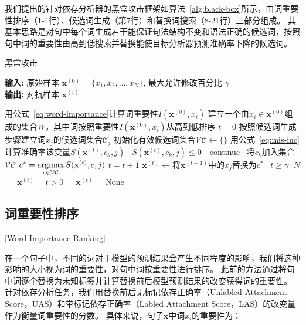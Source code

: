 我们提出的针对依存分析器的黑盒攻击框架如算法~\ref{alg:black-box}所示，由词重要性排序（1-4行）、候选词生成（第7行）和替换词搜索（8-21行）三部分组成。
其基本思路是对句中每个词生成若干能保证句法结构不变和语法正确的候选词，按照句中词的重要性由高到低搜索并替换能使目标分析器预测准确率下降的候选词。

\begin{algorithm}[!h]
	\begin{small}
		\small
		\caption{黑盒攻击}
		\label{alg:black-box}
		\begin{flushleft}
			\textbf{输入:} 原始样本 $\mathbf{x}^{(0)}=\{x_1,x_2,\dots,x_N\}$, 最大允许修改百分比 $\gamma$ \\
			\textbf{输出:} 对抗样本 $\mathbf{x}^{(i)}$
		\end{flushleft}
		\begin{algorithmic}[1]
			\STATE 用公式~\ref{eq:word-importance}计算词重要性$I(\mathbf{x}^{(0)},x_i)$
			\ENDFOR
			\STATE 建立一个由$x_i\in\mathbf{x}^{(0)}$组成的集合$W$，其中词按照重要性$I(\mathbf{x}^{(0)},x_i)$从高到低排序
			\STATE $t=0$
			\STATE 按照候选词生成步骤建立词$x_j$的候选词集合$\mathcal{C}_j$
			\STATE 初始化有效候选词集合$\mathcal{VC} \leftarrow \{\}$
			\STATE 用公式~\ref{eq:mis-inc}计算准确率该变量$S(\mathbf{x}^{(t)},c_k,j)$
			\STATE \algorithmicif\  $S(\mathbf{x}^{(t)},c_k,j) \le 0$\ \algorithmicthen\ continue\ \algorithmicendif
			\STATE 将$c_k$加入集合$\mathcal{VC}$
			\ENDFOR
			\STATE $c^* = \operatorname*{argmax}\limits_{c \in \mathcal{VC}} S(\mathbf{x}^{(t)},c,j)$
			\STATE $t = t + 1$
			\STATE $\mathbf{x}^{(t)} \leftarrow \text{将} \mathbf{x}^{(t-1)} \text{中的} x_j  \text{替换为} c^*$
			\STATE \algorithmicif\  $t \ge \gamma \cdot N $\ \algorithmicthen\   \algorithmicreturn\ $\mathbf{x}^{(t)}$\ \algorithmicendif
			\ENDIF
			\ENDFOR
			\STATE \algorithmicif\  $t > 0$\ \algorithmicthen\   \algorithmicreturn\ $\mathbf{x}^{(t)}$\ \algorithmicelse\ \algorithmicreturn\ None \algorithmicendif
		\end{algorithmic}
	\end{small}
\end{algorithm}


\subsection{词重要性排序}[Word Importance Ranking]

在一个句子中，不同的词对于模型的预测结果会产生不同程度的影响，我们将这种影响的大小视为词的重要性，对句中词按重要性进行排序。
此前的方法通过将句中词逐个替换为未知标签并计算替换前后模型预测结果的改变获得词的重要性。\cite{li2016visualizing,ren2019generating}
针对依存分析任务，我们用替换前后无标记依存正确率（Unlabled Attachment Score，UAS）和带标记依存正确率（Labled Attachment Score，LAS）的改变量作为衡量词重要性的分数。
具体来说，句子$\mathbf{x}$中词$x_i$的重要性为：

